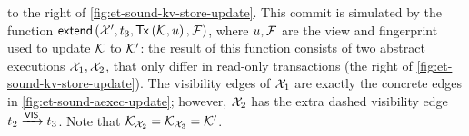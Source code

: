to the right of \cref{fig:et-sound-kv-store-update}. This commit is simulated by the function 
\(\extend[\aexec', \txid_{3}, \Tx[\hh, \vi], \fp]\), where \(u, \mathcal{F}\) are the view and fingerprint used to 
update \(\mathcal{K}\) to \(\mathcal{K}'\): the result of this function consists of two abstract executions \(\mathcal{X}_1, \mathcal{X}_2\), 
that only differ in read-only transactions (the right of \cref{fig:et-sound-kv-store-update}).
The visibility edges of \(\mathcal{X}_1\) are exactly the concrete edges in \cref{fig:et-sound-aexec-update}; however, 
\(\mathcal{X}_2\) has the extra dashed visibility edge \(t_{2} \xrightarrow{\mathsf{VIS}} t_{3}\). 
Note that \(\mathcal{K}_{\mathcal{X}_2} = \mathcal{K}_{\mathcal{X}_3} = \mathcal{K}'\).





